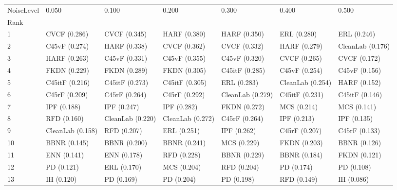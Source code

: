 \begin{tabular}{lllllll}
\toprule
NoiseLevel &             0.050 &             0.100 &             0.200 &             0.300 &             0.400 &             0.500 \\
Rank &                   &                   &                   &                   &                   &                   \\
\midrule
1    &      CVCF (0.286) &      CVCF (0.345) &      HARF (0.380) &      HARF (0.350) &       ERL (0.280) &       ERL (0.246) \\
2    &     C45vF (0.274) &      HARF (0.338) &      CVCF (0.362) &      CVCF (0.332) &      HARF (0.279) &  CleanLab (0.176) \\
3    &      HARF (0.263) &     C45vF (0.331) &     C45vF (0.355) &     C45vF (0.320) &      CVCF (0.265) &      CVCF (0.172) \\
4    &      FKDN (0.229) &      FKDN (0.289) &      FKDN (0.305) &    C45itF (0.285) &     C45vF (0.254) &     C45vF (0.156) \\
5    &    C45itF (0.216) &    C45itF (0.273) &    C45itF (0.305) &       ERL (0.283) &  CleanLab (0.254) &      HARF (0.152) \\
6    &     C45rF (0.209) &     C45rF (0.264) &     C45rF (0.292) &  CleanLab (0.279) &    C45itF (0.231) &    C45itF (0.146) \\
7    &       IPF (0.188) &       IPF (0.247) &       IPF (0.282) &      FKDN (0.272) &       MCS (0.214) &       MCS (0.141) \\
8    &       RFD (0.160) &  CleanLab (0.220) &  CleanLab (0.272) &     C45rF (0.264) &       IPF (0.213) &       IPF (0.135) \\
9    &  CleanLab (0.158) &       RFD (0.207) &       ERL (0.251) &       IPF (0.262) &     C45rF (0.207) &     C45rF (0.133) \\
10   &      BBNR (0.145) &      BBNR (0.200) &      BBNR (0.241) &       MCS (0.229) &      FKDN (0.203) &      BBNR (0.126) \\
11   &       ENN (0.141) &       ENN (0.178) &       RFD (0.228) &      BBNR (0.229) &      BBNR (0.184) &      FKDN (0.121) \\
12   &        PD (0.121) &       ERL (0.170) &       MCS (0.204) &       RFD (0.204) &        PD (0.174) &        PD (0.108) \\
13   &        IH (0.120) &        PD (0.169) &        PD (0.204) &        PD (0.198) &       RFD (0.149) &        IH (0.086) \\

\end{tabular}
